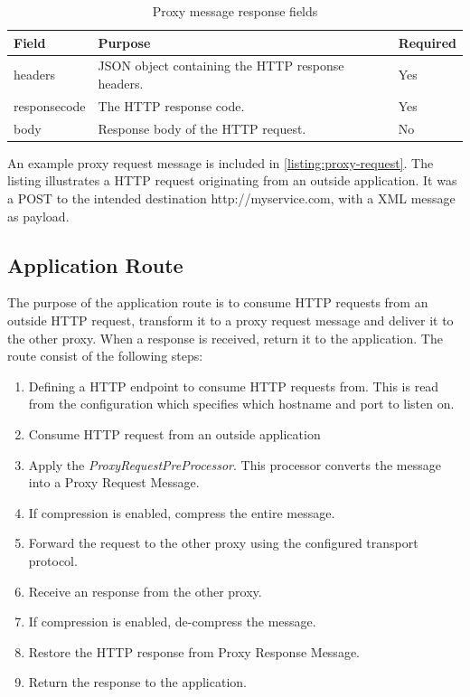 \begin{table}[h]
\begin{tabularx}{\textwidth}{|l|X|l|}
\hline
\textbf{Field} & \textbf{Purpose}   & \textbf{Required} \\ \hline
headers        & JSON object containing the HTTP response headers. & Yes  \\ \hline
responsecode   & The HTTP response code. & Yes \\ \hline
body           & Response body of the HTTP request. & No            \\ \hline
\end{tabularx}
\caption{Proxy message response fields}
\label{table-proxy-response}

\end{table}

An example proxy request message is included in \cref{listing:proxy-request}.
The listing illustrates a HTTP request originating from an outside application.
It was a POST to the intended destination http://myservice.com, with a XML
message as payload.



\paragraph{}

\subsection{Application Route}

The purpose of the application route is to consume HTTP requests from an
outside HTTP request, transform it to a proxy request message and deliver it
to the other proxy. When a response is received, return it to the application.
The route consist of the following steps:

\begin{enumerate}
	\item Defining a HTTP endpoint to consume HTTP requests from. This is read from the configuration which specifies which hostname and port to listen on.
	\item Consume HTTP request from an outside application
	\item Apply the \textit{ProxyRequestPreProcessor}. This processor converts the message into a Proxy Request Message.
	\item If compression is enabled, compress the entire message.
	\item Forward the request to the other proxy using the configured transport protocol.
	\item Receive an response from the other proxy.
	\item If compression is enabled, de-compress the message.
	\item Restore the HTTP response from Proxy Response Message.
	\item Return the response to the application.
\end{enumerate}

